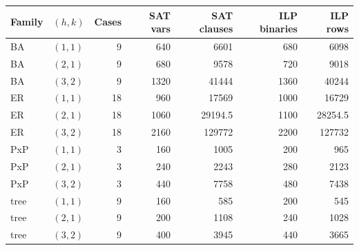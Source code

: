 \begin{tabular}{llrrrrr}
\toprule
Family & $(h,k)$ & Cases & SAT vars & SAT clauses & ILP binaries & ILP rows\\
\midrule
BA & $(1,1)$ & 9 & 640 & 6601 & 680 & 6098\\
BA & $(2,1)$ & 9 & 680 & 9578 & 720 & 9018\\
BA & $(3,2)$ & 9 & 1320 & 41444 & 1360 & 40244\\
ER & $(1,1)$ & 18 & 960 & 17569 & 1000 & 16729\\
ER & $(2,1)$ & 18 & 1060 & 29194.5 & 1100 & 28254.5\\
ER & $(3,2)$ & 18 & 2160 & 129772 & 2200 & 127732\\
PxP & $(1,1)$ & 3 & 160 & 1005 & 200 & 965\\
PxP & $(2,1)$ & 3 & 240 & 2243 & 280 & 2123\\
PxP & $(3,2)$ & 3 & 440 & 7758 & 480 & 7438\\
tree & $(1,1)$ & 9 & 160 & 585 & 200 & 545\\
tree & $(2,1)$ & 9 & 200 & 1108 & 240 & 1028\\
tree & $(3,2)$ & 9 & 400 & 3945 & 440 & 3665\\
\bottomrule
\end{tabular}
